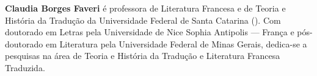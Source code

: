 \textbf{Claudia Borges Faveri} é professora de Literatura Francesa e de Teoria e
História da Tradução da Universidade Federal de Santa Catarina (). Com
doutorado em Letras pela Universidade de Nice Sophia Antipolis --- França e
pós-doutorado em Literatura pela Universidade Federal de Minas Gerais,
dedica-se a pesquisas na área de Teoria e História da Tradução e Literatura
Francesa Traduzida.



